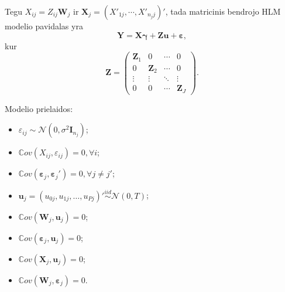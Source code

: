 \documentclass[11pt,a4paper]{article}
\begin{document}
\indent Tegu $X_{ij}=Z_{ij}\mathbf{W}_j$ ir $\mathbf{X}_j = (X'_{1j}, \cdots, X'_{n_jj})'$, tada matricinis bendrojo HLM modelio pavidalas yra
\begin{equation} \label{eq:bendrasHLM}
\mathbf{Y}=\mathbf{X}\boldsymbol{\gamma}+\mathbf{Z}\mathbf{u}+\boldsymbol{\varepsilon},
\end{equation}
kur
\[
\mathbf{Z}=
\begin{pmatrix}
\mathbf{Z}_1 & 0 & \cdots & 0 \\
0 & \mathbf{Z}_2 & \cdots & 0\\
\vdots & \vdots & \ddots & \vdots \\
0&0 & \cdots & \mathbf{Z}_J
\end{pmatrix}.
\]

\indent Modelio prielaidos:
\begin{itemize}
\item $\varepsilon_{ij} \sim \mathcal{N}(0, \sigma^2\mathbf{I}_{n_j})$;
\item $\mathbb{C}ov(X_{ij},\varepsilon_{ij})=0, \forall i$;
\item $\mathbb{C}ov(\boldsymbol{\varepsilon}_j,\boldsymbol{\varepsilon}_j')=0, \forall j\neq j'$;
\item $\mathbf{u}_j = (u_{0j}, u_{1j}, \dots, u_{Pj})' \overset{iid}{\sim} \mathcal{N}(0,T)$;
\item $\mathbb{C}ov(\mathbf{W}_{j}, \mathbf{u}_j)=0$;
\item $\mathbb{C}ov(\boldsymbol{\varepsilon}_j, \mathbf{u}_j)=0$;
\item $\mathbb{C}ov(\mathbf{X}_j, \mathbf{u}_j)=0$;
\item $\mathbb{C}ov(\mathbf{W}_j, \boldsymbol{\varepsilon}_j)=0$.
\end{itemize}
\end{document}
